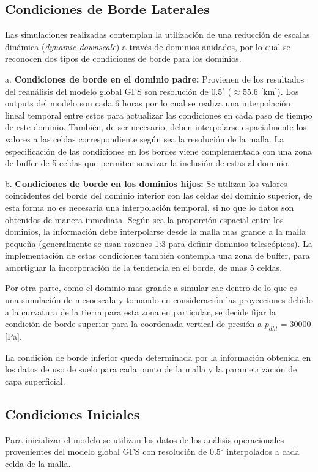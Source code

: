 \subsection{Condiciones de Borde Laterales}
Las simulaciones realizadas contemplan la utilización de una reducción de escalas dinámica (\emph{dynamic downscale}) a través de dominios anidados, por lo cual se reconocen dos tipos de condiciones de borde para los dominios.
\begin{enumerate*}
	\item[a.] \textbf{Condiciones de borde en el dominio padre:} Provienen de los resultados del reanálisis del modelo global GFS son resolución de $0.5^\circ$ ($\approx 55.6$ [km]). Los outputs del modelo son cada 6 horas por lo cual se realiza una interpolación lineal temporal entre estos para actualizar las condiciones en cada paso de tiempo de este dominio. También, de ser necesario, deben interpolarse espacialmente los valores a las celdas correspondiente según sea la resolución de la malla. La especificación de las condiciones en los bordes viene complementada con una zona de buffer de 5 celdas que permiten suavizar la inclusión de estas al dominio.
	\item[b.] \textbf{Condiciones de borde en los dominios hijos:} Se utilizan los valores coincidentes del borde del dominio interior con las celdas del dominio superior, de esta forma no es necesaria una interpolación temporal, si no que lo datos son obtenidos de manera inmediata. Según sea la proporción espacial entre los dominios, la información debe interpolarse desde la malla mas grande a la malla pequeña (generalmente se usan razones 1:3 para definir dominios telescópicos). La implementación de estas condiciones también contempla una zona de buffer, para amortiguar la incorporación de la tendencia en el borde, de unas 5 celdas.
\end{enumerate*}
Por otra parte, como el dominio mas grande a simular cae dentro de lo que es una simulación de mesoescala y tomando en consideración las proyecciones debido a la curvatura de la tierra para esta zona en particular, se decide fijar la condición de borde superior para la coordenada vertical de presión a $p_{dht} = 30000$ [Pa].

La condición de borde inferior queda determinada por la información obtenida en los datos de uso de suelo para cada punto de la malla y la parametrización de capa superficial.
\subsection{Condiciones Iniciales}
Para inicializar el modelo se utilizan los datos de los análisis operacionales provenientes del modelo global GFS con resolución de $0.5^\circ$ interpolados a cada celda de la malla.

